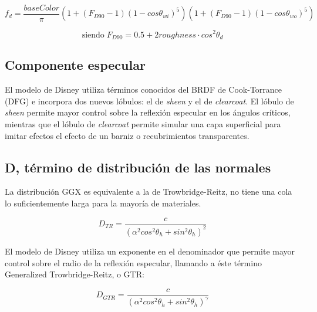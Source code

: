     
        $$
        f_d = \frac{baseColor}{\pi}
        \left(  1 + (F_{D90} - 1)(1 - cos\theta_{wi})^5  \right)
        \left(  1 + (F_{D90} - 1)(1 - cos\theta_{wo})^5  \right)
        $$
    
        \begin{equation}
        \textrm{siendo} \; F_{D90} = 0.5 + 2roughness\cdot{cos^2\theta_d}
        \end{equation}
    
        \singlespacing
        \subsection{Componente especular}
        El modelo de Disney \autocite{disney12} utiliza t\'erminos conocidos del BRDF de Cook-Torrance \autocite{cooktorrance}
        (DFG) e incorpora dos nuevos l\'obulos: el de \textit{sheen} y el de \textit{clearcoat}. El l\'obulo de \textit{sheen}
        permite mayor control sobre la reflexi\'on especular en los \'angulos cr\'iticos, mientras que el l\'obulo de
        \textit{clearcoat} permite simular una capa superficial para imitar efectos el efecto de un barniz o recubrimientos
        transparentes.

            \subsection*{D, t\'ermino de distribuci\'on de las normales}
                La distribuci\'on GGX es equivalente a la de Trowbridge-Reitz, no tiene una cola lo suficientemente larga para la
                mayor\'ia de materiales.

                \begin{equation}
                    D_{TR} = \frac
                    {c}
                    {(\alpha^2 cos^2 \theta_h + sin^2 \theta_h)^2}
                \end{equation}
                \singlespacing

                El modelo de Disney utiliza un exponente en el denominador que permite mayor control sobre el radio de la reflexi\'on
                especular, llamando a \'este t\'ermino Generalized Trowbridge-Reitz, o GTR:

                \begin{equation}
                    D_{GTR} = \frac
                    {c}
                    {(\alpha^2 cos^2 \theta_h + sin^2 \theta_h)^\gamma}
                \end{equation}
                \singlespacing

